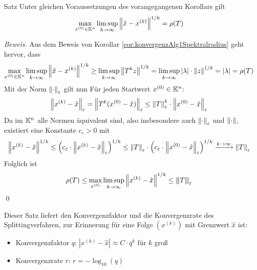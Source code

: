 \begin{colbox}{Satz}
  Unter gleichen Voraussetzungen des vorangegangenen Korollars gilt 
  \begin{align*}
    \max_{x^{(0)}\in\K^n} \limsup_{k\rightarrow \infty} \vertn{2}{\hat{x}-x^{(k)}}^{1/k} = \rho(T)
  \end{align*}
\end{colbox}
\textit{Beweis.}
Aus dem Beweis von Korollar \ref{cor:konvergenzAlg1Spektralradius} geht hervor, dass
%
\begin{align*}
  \max_{x^{(0)}\in\K^n} \limsup_{k\rightarrow \infty} \vertn{2}{\hat{x}-x^{(k)}}^{1/k}
  \geq\limsup_{k\rightarrow\infty} \vertn{2}{T^kz}^{1/k}
  = \limsup_{k\rightarrow\infty}|\lambda|\cdot\vertn{2}{z}^{1/k}
  = |\lambda|=\rho(T)
\end{align*}
%
Mit der Norm $\vertn{2}{\cdot}_\varepsilon$ gilt nun Für jeden Startwert $x^{(0)}\in\mathbb K^n$: 
%
\begin{align*}
  \vertn{2}{x^{(k)}-\hat{x}}_\varepsilon 
  = \vertn{2}{T^k(x^{(0)}-\hat{x})}_\varepsilon
  \leq \vertn{2}{T}_\varepsilon^k\cdot \vertn{2}{x^{(0)}-\hat{x}}_\varepsilon
\end{align*}
%
Da im $\mathbb K^n$ alle Normen äquivalent sind, also insbesondere auch $\vertn{2}{\cdot}_\varepsilon$ 
und $\vertn{2}{\cdot}$, existiert eine Konstante $c_\varepsilon>0$ mit
%
\begin{align*}
  \vertn{2}{x^{(k)}-\hat{x}}^{1/k}
  \leq \left(c_\varepsilon\cdot\vertn{2}{x^{(k)}-\hat{x}}_\varepsilon\right)^{1/k}
  \leq \vertn{2}{T}_\varepsilon \cdot \left(c_\varepsilon\cdot\vertn{2}{x^{(0)}-\hat{x}}_\varepsilon\right)^{1/k}
  \xrightarrow{k\rightarrow\infty} 
  \vertn{2}{T}_\varepsilon
\end{align*}
%
Folglich ist 
%
\begin{align*}
  \rho(T) 
  \leq \max_{x^{(0)}} \limsup_{k\rightarrow \infty} \vertn{2}{x^{(k)}-\hat{x}}^{1/k}
  \leq \vertn{3}{T}_\varepsilon
\end{align*}
%
\qed

Dieser Satz liefert den Konvergenzfaktor und die Konvergenzrate des Splittingverfahren, zur Erinnerung für eine Folge 
$(x^{(k)})$ mit Grenzwert $\hat{x}$ ist:
\begin{itemize}
  \item Konvergenzfaktor $q$: $ |x^{(k)} - \hat{x}| \approx C\cdot q^k $ für $k$ groß
  \item Konvergenzrate $r$: $r=-\log_{10}(q)$
\end{itemize}

